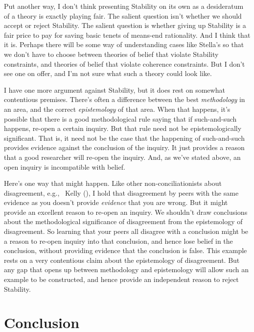 \documentclass[
  11pt,
  letterpaper,
  DIV=11,
  numbers=noendperiod,
  twoside]{scrartcl}
\begin{document}
Put another way, I don't think presenting Stability on its own as a
desideratum of a theory is exactly playing fair. The salient question
isn't whether we should accept or reject Stability. The salient question
is whether giving up Stability is a fair price to pay for saving basic
tenets of means-end rationality. And I think that it is. Perhaps there
will be some way of understanding cases like Stella's so that we don't
have to choose between theories of belief that violate Stability
constraints, and theories of belief that violate coherence constraints.
But I don't see one on offer, and I'm not sure what such a theory could
look like.

I have one more argument against Stability, but it does rest on somewhat
contentious premises. There's often a difference between the best
\emph{methodology} in an area, and the correct \emph{epistemology} of
that area. When that happens, it's possible that there is a good
methodological rule saying that if such-and-such happens, re-open a
certain inquiry. But that rule need not be epistemologically
significant. That is, it need not be the case that the happening of
such-and-such provides evidence against the conclusion of the inquiry.
It just provides a reason that a good researcher will re-open the
inquiry. And, as we've stated above, an open inquiry is incompatible
with belief.

Here's one way that might happen. Like other non-conciliationists about
disagreement, e.g., ~Kelly (), I
hold that disagreement by peers with the same evidence as you doesn't
provide \emph{evidence} that you are wrong. But it might provide an
excellent reason to re-open an inquiry. We shouldn't draw conclusions
about the methodological significance of disagreement from the
epistemology of disagreement. So learning that your peers all disagree
with a conclusion might be a reason to re-open inquiry into that
conclusion, and hence lose belief in the conclusion, without providing
evidence that the conclusion is false. This example rests on a very
contentious claim about the epistemology of disagreement. But any gap
that opens up between methodology and epistemology will allow such an
example to be constructed, and hence provide an independent reason to
reject Stability.

\section{Conclusion}\label{conclusion}
\end{document}
